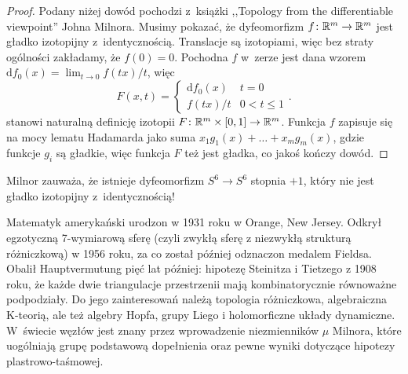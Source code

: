 \begin{proof}
    Podany niżej dowód pochodzi z~książki ,,Topology from the differentiable viewpoint'' Johna Milnora.
%
    Musimy pokazać, że dyfeomorfizm $f \colon \mathbb R^m \to \mathbb R^m$ jest gładko izotopijny z~identycznością.
    Translacje są izotopiami, więc bez straty ogólności zakładamy, że $f(0) = 0$.
    Pochodna $f$ w~zerze jest dana wzorem $\mathrm{d}f_0(x) = \lim_{t \to 0} f(tx) /t$, więc
    \begin{equation}
        F(x, t) = \begin{cases}
            \mathrm{d}f_0(x) & t = 0 \\
            f(tx) / t & 0 < t \le 1
        \end{cases} .
    \end{equation}
    stanowi naturalną definicję izotopii $F \colon \mathbb R^m \times [0, 1] \to \mathbb R^m$.
    Funkcja $f$ zapisuje się na mocy lematu Hadamarda jako suma $x_1 g_1(x) + \ldots + x_mg_m(x)$, gdzie funkcje $g_i$ są gładkie, więc funkcja $F$ też jest gładka, co jakoś kończy dowód.
%    
\end{proof}

Milnor zauważa, że istnieje dyfeomorfizm $S^6 \to S^6$ stopnia $+1$, który nie jest gładko izotopijny z~identycznością!
%

\begin{remark}
    Matematyk amerykański urodzon w 1931 roku w Orange, New Jersey.
    Odkrył egzotyczną 7-wymiarową sferę (czyli zwykłą sferę z niezwykłą strukturą różniczkową) w 1956 roku, za co został później odznaczon medalem Fieldsa.
    Obalił Hauptvermutung pięć lat później: hipotezę Steinitza i Tietzego z 1908 roku, że każde dwie triangulacje przestrzenii mają kombinatorycznie równoważne podpodziały.
    Do jego zainteresowań należą topologia różniczkowa, algebraiczna K-teorią, ale też algebry Hopfa, grupy Liego i holomorficzne układy dynamiczne.
    W~świecie węzłów jest znany przez wprowadzenie niezmienników $\mu$ Milnora, które uogólniają grupę podstawową dopełnienia oraz pewne wyniki dotyczące hipotezy plastrowo-taśmowej.
\end{remark}
%
%
%

